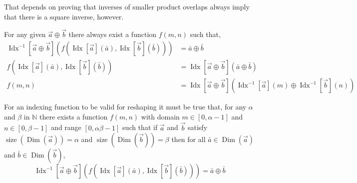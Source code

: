 \documentclass[12pt]{book}
\theoremstyle{plain}
\theoremstyle{definition}
\theoremstyle{ppart}
\theoremstyle{case}
\theoremstyle{solution}
\DeclareMathOperator{\Dim}{Dim}
\DeclareMathOperator{\Idx}{Idx}
\DeclareMathOperator{\size}{size}
\begin{document}
\begin{appendices}
That depends on proving that inverses of smaller product overlaps always imply
that there is a square inverse, however.

\begin{landscape}

For any given $\vec{a} \oplus \vec{b}$ there always exist a function $f(m, n)$ such that,
\begin{align*}
  \Idx^{-1}[\vec{a} \oplus \vec{b}]\left(f(\Idx[\vec{a}](\bar{a}), \Idx[\vec{b}](\bar{b}))\right) &= \bar{a} \oplus \bar{b} \\
  f(\Idx[\vec{a}](\bar{a}), \Idx[\vec{b}](\bar{b})) &= \Idx[\vec{a} \oplus \vec{b}](\bar{a} \oplus \bar{b}) \\
  f(m, n) &= \Idx[\vec{a} \oplus \vec{b}](\Idx^{-1}[\vec{a}](m) \oplus \Idx^{-1}[\vec{b}](n))
\end{align*}

For an indexing function to be valid for reshaping it must be true that,
for any $\alpha$ and $\beta$ in $\mathbb{N}$ there exists a function $f(m, n)$ with domain $m \in [0,\alpha-1]$ and $n \in [0,\beta-1]$
and range $[0, \alpha \beta - 1]$ such that if $\vec{a}$ and $\vec{b}$ satisfy $\size(\Dim(\vec{a})) = \alpha$ and $\size(\Dim(\vec{b})) = \beta$
then for all $\bar{a} \in \Dim(\vec{a})$ and $\bar{b} \in \Dim(\vec{b})$,
\[ \Idx^{-1}[\vec{a} \oplus \vec{b}]\left(f(\Idx[\vec{a}](\bar{a}), \Idx[\vec{b}](\bar{b}))\right) = \bar{a} \oplus \bar{b} \]


\end{landscape}
\end{appendices}
\end{document}
